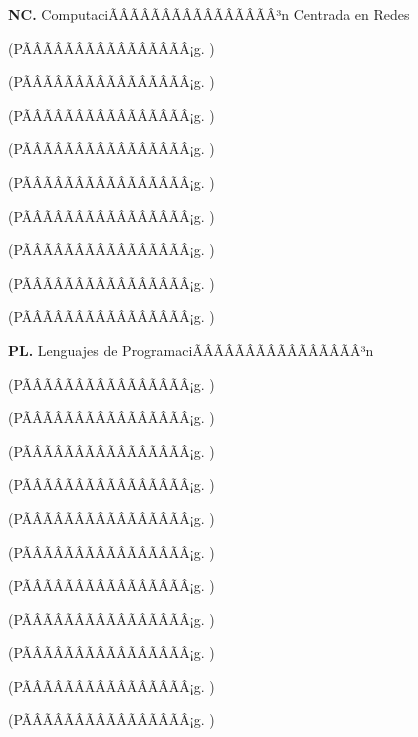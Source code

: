 	\textbf{NC.}  ComputaciÃÂÃÂÃÂÃÂÃÂÃÂÃÂÃÂ³n Centrada en Redes%
	\begin{list}{}{%
		\setlength{\labelwidth}{0pt}%
		\setlength{\leftmargin}{15pt}}%
		\item \NCUNODef(PÃÂÃÂÃÂÃÂÃÂÃÂÃÂÃÂ¡g. \pageref{sec:BOK-NC1})
		\item \NCDOSDef(PÃÂÃÂÃÂÃÂÃÂÃÂÃÂÃÂ¡g. \pageref{sec:BOK-NC2})
		\item \NCTRESDef(PÃÂÃÂÃÂÃÂÃÂÃÂÃÂÃÂ¡g. \pageref{sec:BOK-NC3})
		\item \NCCUATRODef(PÃÂÃÂÃÂÃÂÃÂÃÂÃÂÃÂ¡g. \pageref{sec:BOK-NC4})
		\item \NCCINCODef(PÃÂÃÂÃÂÃÂÃÂÃÂÃÂÃÂ¡g. \pageref{sec:BOK-NC5})
		\item \NCSEISDef(PÃÂÃÂÃÂÃÂÃÂÃÂÃÂÃÂ¡g. \pageref{sec:BOK-NC6})
		\item \NCSIETEDef(PÃÂÃÂÃÂÃÂÃÂÃÂÃÂÃÂ¡g. \pageref{sec:BOK-NC7})
		\item \NCOCHODef(PÃÂÃÂÃÂÃÂÃÂÃÂÃÂÃÂ¡g. \pageref{sec:BOK-NC8})
		\item \NCNUEVEDef(PÃÂÃÂÃÂÃÂÃÂÃÂÃÂÃÂ¡g. \pageref{sec:BOK-NC9})
	\end{list}%
	\textbf{PL.}  Lenguajes de ProgramaciÃÂÃÂÃÂÃÂÃÂÃÂÃÂÃÂ³n%
	\begin{list}{}{%
		\setlength{\labelwidth}{0pt}%
		\setlength{\leftmargin}{15pt}}%
		\item \PLUNODef(PÃÂÃÂÃÂÃÂÃÂÃÂÃÂÃÂ¡g. \pageref{sec:BOK-PL1})
		\item \PLDOSDef(PÃÂÃÂÃÂÃÂÃÂÃÂÃÂÃÂ¡g. \pageref{sec:BOK-PL2})
		\item \PLTRESDef(PÃÂÃÂÃÂÃÂÃÂÃÂÃÂÃÂ¡g. \pageref{sec:BOK-PL3})
		\item \PLCUATRODef(PÃÂÃÂÃÂÃÂÃÂÃÂÃÂÃÂ¡g. \pageref{sec:BOK-PL4})
		\item \PLCINCODef(PÃÂÃÂÃÂÃÂÃÂÃÂÃÂÃÂ¡g. \pageref{sec:BOK-PL5})
		\item \PLSEISDef(PÃÂÃÂÃÂÃÂÃÂÃÂÃÂÃÂ¡g. \pageref{sec:BOK-PL6})
		\item \PLSIETEDef(PÃÂÃÂÃÂÃÂÃÂÃÂÃÂÃÂ¡g. \pageref{sec:BOK-PL7})
		\item \PLOCHODef(PÃÂÃÂÃÂÃÂÃÂÃÂÃÂÃÂ¡g. \pageref{sec:BOK-PL8})
		\item \PLNUEVEDef(PÃÂÃÂÃÂÃÂÃÂÃÂÃÂÃÂ¡g. \pageref{sec:BOK-PL9})
		\item \PLDIEZDef(PÃÂÃÂÃÂÃÂÃÂÃÂÃÂÃÂ¡g. \pageref{sec:BOK-PL10})
		\item \PLONCEDef(PÃÂÃÂÃÂÃÂÃÂÃÂÃÂÃÂ¡g. \pageref{sec:BOK-PL11})
	\end{list}%
